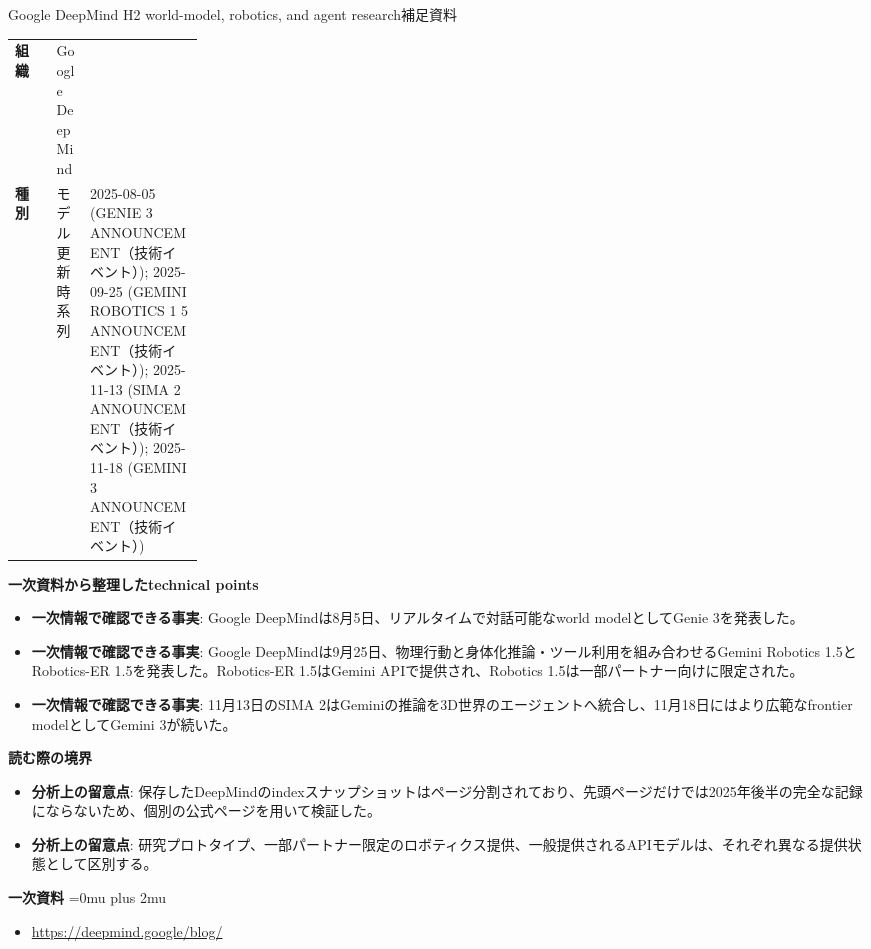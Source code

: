 \begin{technicalnote}{Google DeepMind H2 world-model, robotics, and agent research}{補足資料}
\begingroup
\begin{tabularx}{\linewidth}{@{}>{\bfseries}p{0.22\linewidth}X@{}}
組織 & Google DeepMind \\
種別 & モデル更新
時系列 & 2025-08-05 (GENIE 3 ANNOUNCEMENT（技術イベント）); 2025-09-25 (GEMINI ROBOTICS 1 5 ANNOUNCEMENT（技術イベント）); 2025-11-13 (SIMA 2 ANNOUNCEMENT（技術イベント）); 2025-11-18 (GEMINI 3 ANNOUNCEMENT（技術イベント）) \\
\end{tabularx}
\smallskip
{\bfseries 一次資料から整理したtechnical points}
\begin{itemize}[leftmargin=1.5em,itemsep=0.35em]
\item \textbf{一次情報で確認できる事実}: Google DeepMindは8月5日、リアルタイムで対話可能なworld modelとしてGenie 3を発表した。
\item \textbf{一次情報で確認できる事実}: Google DeepMindは9月25日、物理行動と身体化推論・ツール利用を組み合わせるGemini Robotics 1.5とRobotics-ER 1.5を発表した。Robotics-ER 1.5はGemini APIで提供され、Robotics 1.5は一部パートナー向けに限定された。
\item \textbf{一次情報で確認できる事実}: 11月13日のSIMA 2はGeminiの推論を3D世界のエージェントへ統合し、11月18日にはより広範なfrontier modelとしてGemini 3が続いた。
\end{itemize}
\begin{minipage}{\linewidth}
{\bfseries 読む際の境界}
\begin{itemize}[leftmargin=1.5em,itemsep=0.35em]
\item \textbf{分析上の留意点}: 保存したDeepMindのindexスナップショットはページ分割されており、先頭ページだけでは2025年後半の完全な記録にならないため、個別の公式ページを用いて検証した。
\item \textbf{分析上の留意点}: 研究プロトタイプ、一部パートナー限定のロボティクス提供、一般提供されるAPIモデルは、それぞれ異なる提供状態として区別する。
\end{itemize}
\begin{samepage}
{\bfseries 一次資料}
\begingroup\sloppy
\Urlmuskip=0mu plus 2mu\relax
\begin{itemize}[leftmargin=1.5em,itemsep=0.25em]
\item {\scriptsize\url{https://deepmind.google/blog/}}
\end{itemize}
\endgroup
\end{samepage}
\end{minipage}
\endgroup
\end{technicalnote}
\medskip


